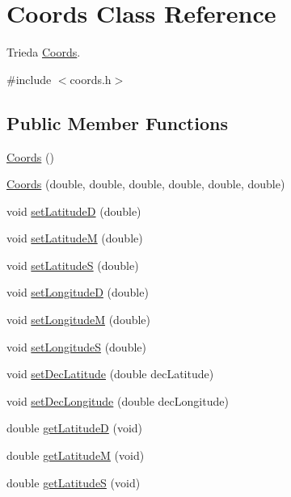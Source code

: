 \hypertarget{classCoords}{\section{Coords Class Reference}
\label{classCoords}
}


Trieda \hyperlink{classCoords}{Coords}.  




{\ttfamily \#include $<$coords.\-h$>$}

\subsection*{Public Member Functions}
\begin{DoxyCompactItemize}
\item 
\hyperlink{classCoords_a5922d1783cefa759950faa50ac347191}{Coords} ()
\item 
\hyperlink{classCoords_a370c5fad753558f68cfe993ccfa6aefc}{Coords} (double, double, double, double, double, double)
\item 
void \hyperlink{classCoords_a0bf0acf0cddd3ca2d010adf98400bb12}{set\-Latitude\-D} (double)
\item 
void \hyperlink{classCoords_ad0384a14a8c3665c367723574ed6c145}{set\-Latitude\-M} (double)
\item 
void \hyperlink{classCoords_ab87a774c4b6eff3abf498a39e767c416}{set\-Latitude\-S} (double)
\item 
void \hyperlink{classCoords_a8d32d6e7a46e5754120f9024c27df7a5}{set\-Longitude\-D} (double)
\item 
void \hyperlink{classCoords_a7d54f335e89544d1f1cdab70eebc6fed}{set\-Longitude\-M} (double)
\item 
void \hyperlink{classCoords_a5c2ac2d68dee771445b953e158bc5505}{set\-Longitude\-S} (double)
\item 
void \hyperlink{classCoords_a6733bf6813065b00d254830f2f02315b}{set\-Dec\-Latitude} (double dec\-Latitude)
\item 
void \hyperlink{classCoords_acfe86d1cd0160163dee9119e03a78438}{set\-Dec\-Longitude} (double dec\-Longitude)
\item 
double \hyperlink{classCoords_af48729f8925b858e242c630261ed0859}{get\-Latitude\-D} (void)
\item 
double \hyperlink{classCoords_a4c836418545be6776c65806286e62084}{get\-Latitude\-M} (void)
\item 
double \hyperlink{classCoords_aa73a7700f91f4075638071787b08dd2e}{get\-Latitude\-S} (void)
\item 

\end{DoxyCompactItemize}
